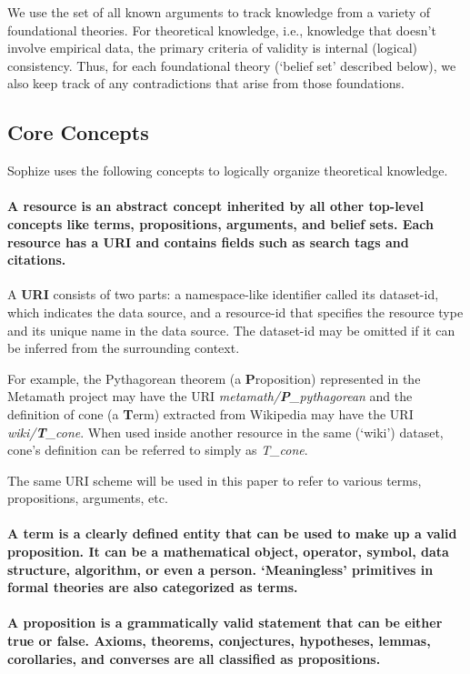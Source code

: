 \documentclass[a4paper]{article}
\begin{document}
We use the set of all known arguments to track knowledge from a variety of foundational theories. For theoretical knowledge, i.e., knowledge that doesn't involve empirical data, the primary criteria of validity is internal (logical) consistency. Thus, for each foundational theory (`belief set' described below), we also keep track of any contradictions that arise from those foundations.

\subsection{Core Concepts}
Sophize uses the following concepts to logically organize theoretical knowledge.

\paragraph{A \textbf{resource} is an abstract concept inherited by all other top-level concepts like terms, propositions, arguments, and belief sets. Each resource has a URI and contains fields such as search tags and citations.}

A \textbf{URI} consists of two parts: a namespace-like identifier called its dataset-id, which indicates the data source, and a resource-id that specifies the resource type and its unique name in the data source. The dataset-id may be omitted if it can be inferred from the surrounding context.

For example, the Pythagorean theorem (a \textbf{P}roposition) represented in the Metamath project may have the URI \emph{metamath/\textbf{P}\_pythagorean} and the definition of cone (a \textbf{T}erm) extracted from Wikipedia may have the URI \emph{wiki/\textbf{T}\_cone}. When used inside another resource in the same (`wiki') dataset, cone's definition can be referred to simply as \emph{T\_cone}.

The same URI scheme will be used in this paper to refer to various terms, propositions, arguments, etc.

\paragraph{A \textbf{term} is a clearly defined entity that can be used to make up a valid proposition. It can be a mathematical object, operator, symbol, data structure, algorithm, or even a person. `Meaningless' primitives in formal theories are also categorized as terms.}

\paragraph{A \textbf{proposition} is a grammatically valid statement that can be either true or false. Axioms, theorems, conjectures, hypotheses, lemmas, corollaries, and converses are all classified as propositions.}
\end{document}
